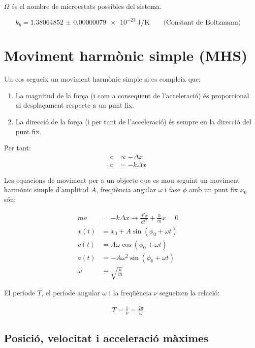 $\Omega$ és el nombre de microestats possibles del sistema.

\begin{equation}
    k_b =  \SI{1.38064852(79)e-23}{\joule\per\kelvin} \qquad \text{(Constant de Boltzmann)}
\end{equation}

\section{Moviment harmònic simple (MHS)}
\label{sec:moviment_harmonic_simple}

Un cos segueix un moviment harmònic simple si es compleix que:
\begin{enumerate}
    \item La magnitud de la força (i com a conseqüent de l'acceleració)
        és proporcional al desplaçament respecte a un punt fix.
    \item La direcció de la força (i per tant de l'acceleració) és sempre en la
        direcció del punt fix.
\end{enumerate}
Per tant:
\begin{align}
    a &\propto -\Delta x\\
    a &= -k\Delta x
\end{align}

Les equacions de moviment per a un objecte que es mou seguint un moviment harmònic simple d'amplitud $A$, freqüència angular $\omega$ i fase $\phi$ amb un punt fix $x_0$són:

\begin{align}
    ma &= -k\Delta x \longrightarrow \frac{d^2x}{dt^2} + \frac{k}{m}x = 0 \nonumber \\
    x(t) &= x_0 + A\sin(\phi_0+\omega t) \\
    v(t) &= A\omega\cos(\phi_0+\omega t) \\
    a(t) &= -A\omega^2\sin(\phi_0+\omega t) \\
    \omega &\equiv \sqrt{\frac{k}{m}}
\end{align}

El període $T$, el període angular $\omega$ i la freqüència $\nu$ segueixen la
relació:

\begin{align}
    T = \frac{1}{\nu} = \frac{2\pi}{\omega}
\end{align}

\subsection{Posició, velocitat i acceleració màximes}
\label{sub:posicio_velocitat_i_acceleracio_maximes}



